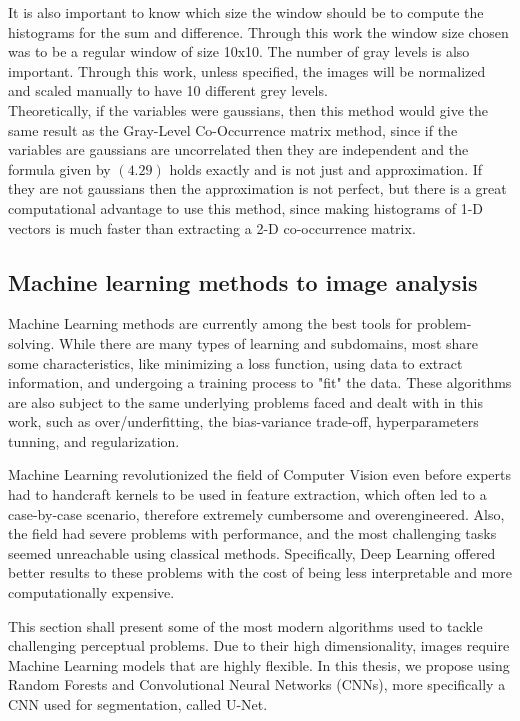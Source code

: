It is also important to know which size the window should be to compute the histograms for the sum and difference. Through this work the window size chosen was to be a regular window of size 10x10.
The number of gray levels is also important. Through this work, unless specified, the images will be normalized and scaled manually to have 10 different grey levels.
\\
Theoretically, if the variables were gaussians, then this method would give the same result as the Gray-Level Co-Occurrence matrix method, since if the variables are gaussians are uncorrelated then they are independent and the formula given by $(4.29)$ holds exactly and is not just and approximation. If they are not gaussians then the approximation is not perfect, but there is a great computational advantage to use this method, since making histograms of 1-D vectors is much faster than extracting a 2-D co-occurrence matrix.

\subsection{Machine learning methods to image analysis}

Machine Learning methods are currently among the best tools for problem-solving. While there are many types of learning and subdomains, most share some characteristics, like minimizing a loss function, using data to extract information, and undergoing a training process to "fit" the data. These algorithms are also subject to the same underlying problems faced and dealt with in this work, such as over/underfitting, the bias-variance trade-off, hyperparameters tunning, and regularization.

Machine Learning revolutionized the field of Computer Vision even before experts had to handcraft kernels to be used in feature extraction, which often led to a case-by-case scenario, therefore extremely cumbersome and overengineered. Also, the field had severe problems with performance, and the most challenging tasks seemed unreachable using classical methods. Specifically, Deep Learning offered better results to these problems with the cost of being less interpretable and more computationally expensive.

This section shall present some of the most modern algorithms used to tackle challenging perceptual problems. Due to their high dimensionality, images require Machine Learning models that are highly flexible. In this thesis, we propose using Random Forests and Convolutional Neural Networks (CNNs), more specifically a CNN used for segmentation, called U-Net.

